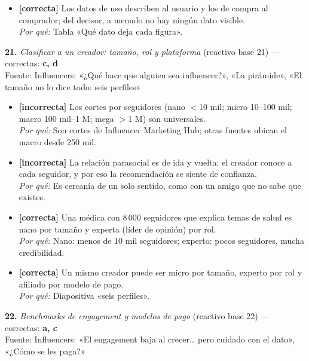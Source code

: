 \documentclass[10pt,letterpaper]{article}
\begin{document}
{\begin{itemize}[leftmargin=1.2em,itemsep=0pt,topsep=1pt,parsep=0pt]
\item[\textbf{d)}] {\footnotesize \textbf{[correcta]} Los datos de uso describen al usuario y los de compra al comprador; del decisor, a menudo no hay ningún dato visible.\\ \textit{Por qué:} Tabla «Qué dato deja cada figura».}
\end{itemize}
\vspace{3pt}\noindent\textbf{21.} \textit{Clasificar a un creador: tamaño, rol y plataforma} (reactivo base 21) — correctas: \textbf{c, d}\\[-1pt]
{\scriptsize Fuente: Influencers: «¿Qué hace que alguien sea influencer?», «La pirámide», «El tamaño no lo dice todo: seis perfiles»}
\begin{itemize}[leftmargin=1.2em,itemsep=0pt,topsep=1pt,parsep=0pt]
\item[\textbf{a)}] {\footnotesize \textbf{[incorrecta]} Los cortes por seguidores (nano $<$10 mil; micro 10--100 mil; macro 100 mil--1 M; mega $>$1 M) son universales.\\ \textit{Por qué:} Son cortes de Influencer Marketing Hub; otras fuentes ubican el macro desde 250 mil.}
\item[\textbf{b)}] {\footnotesize \textbf{[incorrecta]} La relación parasocial es de ida y vuelta: el creador conoce a cada seguidor, y por eso la recomendación se siente de confianza.\\ \textit{Por qué:} Es cercanía de un solo sentido, como con un amigo que no sabe que existes.}
\item[\textbf{c)}] {\footnotesize \textbf{[correcta]} Una médica con 8\,000 seguidores que explica temas de salud es nano por tamaño y experta (líder de opinión) por rol.\\ \textit{Por qué:} Nano: menos de 10 mil seguidores; experto: pocos seguidores, mucha credibilidad.}
\item[\textbf{d)}] {\footnotesize \textbf{[correcta]} Un mismo creador puede ser micro por tamaño, experto por rol y afiliado por modelo de pago.\\ \textit{Por qué:} Diapositiva «seis perfiles».}
\end{itemize}
\vspace{3pt}\noindent\textbf{22.} \textit{Benchmarks de engagement y modelos de pago} (reactivo base 22) — correctas: \textbf{a, c}\\[-1pt]
{\scriptsize Fuente: Influencers: «El engagement baja al crecer… pero cuidado con el dato», «¿Cómo se les paga?»}
\begin{itemize}[leftmargin=1.2em,itemsep=0pt,topsep=1pt,parsep=0pt]

\end{itemize}}
\end{document}
